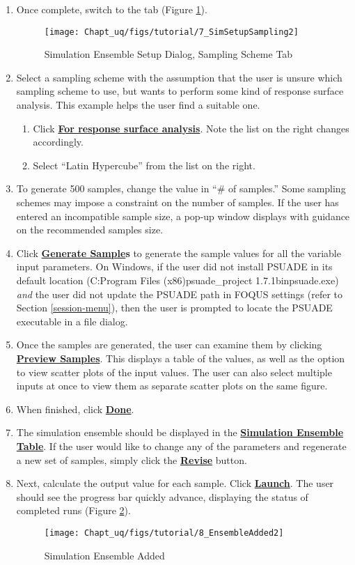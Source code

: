\begin{enumerate}
\item{Once complete, switch to the  tab (Figure \ref{fig:uqt_sim_samplescheme}).}
\begin{figure}[H]
	\centering \texttt{[image: Chapt\_uq/figs/tutorial/7\_SimSetupSampling2]}
	\caption{Simulation Ensemble Setup Dialog, Sampling Scheme Tab}
	\label{fig:uqt_sim_samplescheme}
\end{figure}
\item{Select a sampling scheme with the assumption that the user is unsure which sampling scheme
to use, but wants to perform some kind of response surface analysis. This example helps the user find a suitable one.
\begin{enumerate}
\item{Click \textbf{\underline{For response surface analysis}}. Note the list on the right changes accordingly.}
\item{Select ``Latin Hypercube'' from the list on the right.}
\end{enumerate}
}
\item{To generate 500 samples, change the value in ``\# of samples.'' Some sampling
schemes may impose a constraint on the number of samples. If the user has entered an incompatible sample size, a pop-up window displays with guidance on the recommended samples size.}
\item{Click \textbf{\underline{Generate Sample}s} to generate the sample values for all
  the variable input parameters. On Windows, if the user did not install PSUADE
  in its default location (C:\bs Program Files (x86)\bs psuade\_project
  1.7.1\bs bin\bs psuade.exe) \emph{and} the user did not update the PSUADE path in
  FOQUS settings (refer to Section \ref{session-menu}), then the user is prompted to locate the PSUADE executable in a file dialog.}
\item{Once the samples are generated, the user can examine them by clicking \textbf{\underline{Preview Samples}}. This displays a table of the values, as well as the option to view scatter plots of the input values. The user can also select multiple inputs at once to view them as separate scatter plots on the same figure.}
\item{When finished, click \textbf{\underline{Done}}.}
\item{The simulation ensemble should be displayed in the \textbf{\underline{Simulation Ensemble Table}}. If the user would like to change any of the parameters and regenerate a new set of samples, simply click the \textbf{\underline{Revise}} button.}
\item{Next, calculate the output value for each sample. Click \textbf{\underline{Launch}}. The user should see the progress bar quickly advance, displaying the status of completed runs (Figure \ref{fig:uqt_ensem_added}).}
\begin{figure}[H]
\centering \texttt{[image: Chapt\_uq/figs/tutorial/8\_EnsembleAdded2]}
\caption{Simulation Ensemble Added}
\label{fig:uqt_ensem_added}
\end{figure}


\end{enumerate}
